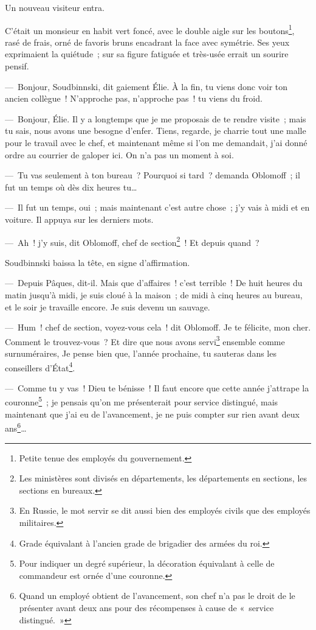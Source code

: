 \documentclass[french,twoside]{book} %
\begin{document}
Un nouveau visiteur entra.\par
C’était un monsieur en habit vert foncé, avec le double aigle sur les boutons\footnote{Petite tenue des employés du gouvernement.}, rasé de frais, orné de favoris bruns encadrant la face avec symétrie. Ses yeux exprimaient la quiétude ; sur sa figure fatiguée et très-usée errait un sourire pensif.\par
— Bonjour, Soudbinnski, dit gaiement Élie. À la fin, tu viens donc voir ton ancien collègue ! N’approche pas, n’approche pas ! tu viens du froid.\par
— Bonjour, Élie. Il y a longtemps que je me proposais de te rendre visite ; mais tu sais, nous avons une besogne d’enfer. Tiens, regarde, je charrie tout une malle pour le travail avec le chef, et maintenant même si l’on me demandait, j’ai donné ordre au courrier de galoper ici. On n’a pas un moment à soi.\par
— Tu vas seulement à ton bureau ? Pourquoi si tard ? demanda Oblomoff ; il fut un temps où dès dix heures tu…\par
— Il fut un temps, oui ; mais maintenant c’est autre chose ; j’y vais à midi et en voiture. Il appuya sur les derniers mots.\par
— Ah ! j’y suis, dit Oblomoff, chef de section\footnote{Les ministères sont divisés en départements, les départements en sections, les sections en bureaux.} ! Et depuis quand ?\par
Soudbinnski baissa la tête, en signe d’affirmation.\par
— Depuis Pâques, dit-il. Mais que d’affaires ! c’est terrible ! De huit heures du matin jusqu’à midi, je suis cloué à la maison ; de midi à cinq heures au bureau, et le soir je travaille encore. Je suis devenu un sauvage.\par
— Hum ! chef de section, voyez-vous cela ! dit Oblomoff. Je te félicite, mon cher. Comment le trouvez-vous ? Et dire que nous avons servi\footnote{En Russie, le mot servir se dit aussi bien des employés civils que des employés militaires.} ensemble comme surnuméraires, Je pense bien que, l’année prochaine, tu sauteras dans les conseillers d’État\footnote{Grade équivalant à l’ancien grade de brigadier des armées du roi.}.\par
— Comme tu y vas ! Dieu te bénisse ! Il faut encore que cette année j’attrape la couronne\footnote{Pour indiquer un degré supérieur, la décoration équivalant à celle de commandeur est ornée d’une couronne.} ; je pensais qu’on me présenterait pour service distingué, mais maintenant que j’ai eu de l’avancement, je ne puis compter sur rien avant deux ans\footnote{Quand un employé obtient de l’avancement, son chef n’a pas le droit de le présenter avant deux ans pour des récompenses à cause de « service distingué. »}…\par
\end{document}

